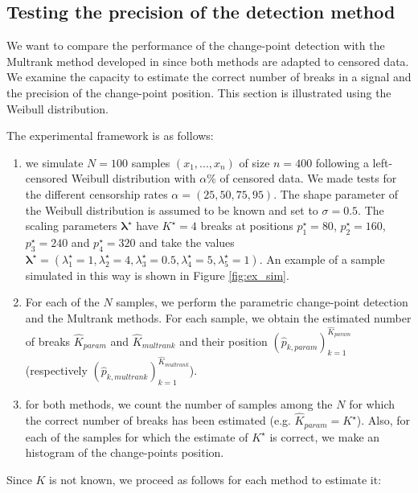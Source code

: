 \subsection{Testing the precision of the detection method}

We want to compare the performance of the change-point detection with the Multrank method developed in \cite{lung2015} since both methods are adapted to censored data. We examine the capacity to estimate the correct number of breaks in a signal and the precision of the change-point position. This section is illustrated using the Weibull distribution.   

The experimental framework is as follows: 
    \begin{enumerate}
        \item we simulate $N=100$ samples $(x_1,...,x_n)$ of size $n=400$  following a left-censored Weibull distribution with $\alpha\%$ of censored data. We made tests for the different censorship rates $\alpha = (25,50,75,95)$. The shape parameter of the Weibull distribution is assumed to be known and set to $\sigma=0.5$. The scaling parameters $\bm{\lambda^\star}$ have $K^\star=4$ breaks at positions $p^\star_1 = 80$, $p^\star_2 = 160$, $p^\star_3 = 240$ and $p^\star_4 = 320$ and take the values $\bm{\lambda^\star}=(\lambda^\star_1 = 1, \lambda^\star_2 = 4, \lambda^\star_3 = 0.5, \lambda^\star_4 = 5, \lambda^\star_5 = 1)$. An example of a sample simulated in this way is shown in Figure \ref{fig:ex_sim}.
        \item For each of the $N$ samples, we perform the parametric change-point detection and the Multrank methods. For each sample, we obtain the estimated number of breaks $\hat K_{param}$ and $\hat K_{multrank}$ and their position $(\hat{p}_{k,param})_{k = 1}^{\hat K_{param}}$ (respectively $(\hat{p}_{k,multrank})_{k = 1}^{\hat K_{multrank}}$).
        \item for both methods, we count the number of samples among the $N$ for which the correct number of breaks has been estimated (e.g. $\hat K_{param} = K^\star$). Also, for each of the samples for which the estimate of $K^\star$ is correct, we make an histogram of the change-points position. 
    \end{enumerate}
Since $K$ is not known, we proceed as follows for each method to estimate it:
